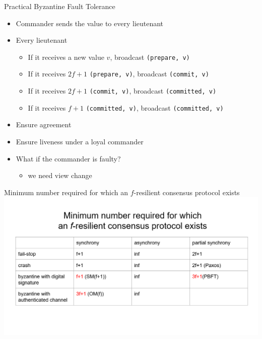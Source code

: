 \documentclass{beamer}
\begin{document}
\begin{frame}{Practical Byzantine Fault Tolerance}
    \begin{itemize}
        \item Commander sends the value to every lieutenant
        \item Every lieutenant
        \begin{itemize}
            \item If it receives a new value \( v \), broadcast \texttt{(prepare, v)}
            \item If it receives \( 2f+1 \) \texttt{(prepare, v)}, broadcast \texttt{(commit, v)}
            \item If it receives \( 2f+1 \) \texttt{(commit, v)}, broadcast \texttt{(committed, v)}
            \item If it receives \( f+1 \) \texttt{(committed, v)}, broadcast \texttt{(committed, v)}
        \end{itemize}
        \item Ensure agreement
        \item Ensure liveness under a loyal commander \pause
        \item What if the commander is faulty?
        \begin{itemize}
            \item we need view change
        \end{itemize}

    \end{itemize}
\end{frame}




\begin{frame}{Minimum number required for which an $f$-resilient consensus protocol exists}
\centering
    \includegraphics[width=\textwidth, height=\textheight, keepaspectratio]{image3/table3.png}
    
\end{frame}
\end{document}
